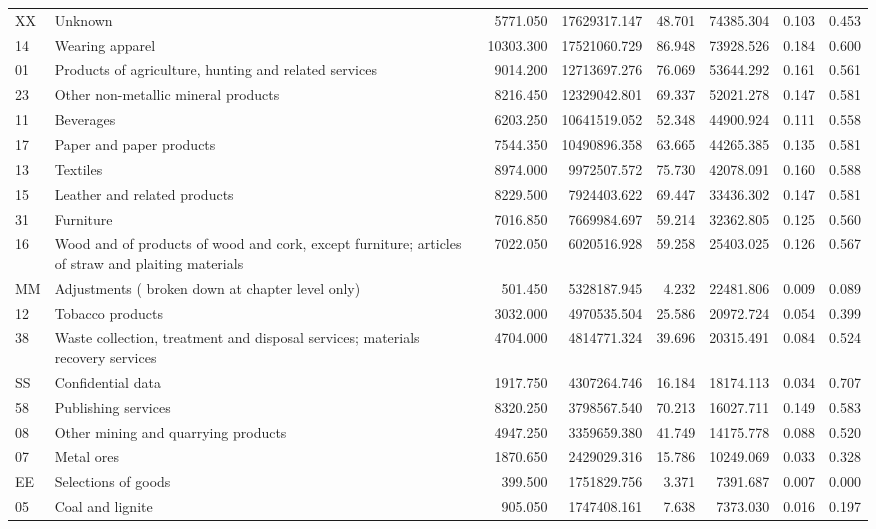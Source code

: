 \begin{tabular}{llrrrrrr}
 XX & Unknown & 5771.050 & 17629317.147 & 48.701 & 74385.304 & 0.103 & 0.453 \\
 14 & Wearing apparel & 10303.300 & 17521060.729 & 86.948 & 73928.526 & 0.184 & 0.600 \\
 01 & Products of agriculture, hunting and related services & 9014.200 & 12713697.276 & 76.069 & 53644.292 & 0.161 & 0.561 \\
 23 & Other non-metallic mineral products & 8216.450 & 12329042.801 & 69.337 & 52021.278 & 0.147 & 0.581 \\
 11 & Beverages & 6203.250 & 10641519.052 & 52.348 & 44900.924 & 0.111 & 0.558 \\
 17 & Paper and paper products & 7544.350 & 10490896.358 & 63.665 & 44265.385 & 0.135 & 0.581 \\
 13 & Textiles & 8974.000 & 9972507.572 & 75.730 & 42078.091 & 0.160 & 0.588 \\
 15 & Leather and related products & 8229.500 & 7924403.622 & 69.447 & 33436.302 & 0.147 & 0.581 \\
 31 & Furniture & 7016.850 & 7669984.697 & 59.214 & 32362.805 & 0.125 & 0.560 \\
 16 & Wood and of products of wood and cork, except furniture; articles of straw and plaiting materials & 7022.050 & 6020516.928 & 59.258 & 25403.025 & 0.126 & 0.567 \\
 MM & Adjustments ( broken down at chapter level only) & 501.450 & 5328187.945 & 4.232 & 22481.806 & 0.009 & 0.089 \\
 12 & Tobacco products & 3032.000 & 4970535.504 & 25.586 & 20972.724 & 0.054 & 0.399 \\
 38 & Waste collection, treatment and disposal services; materials recovery services & 4704.000 & 4814771.324 & 39.696 & 20315.491 & 0.084 & 0.524 \\
 SS & Confidential data & 1917.750 & 4307264.746 & 16.184 & 18174.113 & 0.034 & 0.707 \\
 58 & Publishing services & 8320.250 & 3798567.540 & 70.213 & 16027.711 & 0.149 & 0.583 \\
 08 & Other mining and quarrying products & 4947.250 & 3359659.380 & 41.749 & 14175.778 & 0.088 & 0.520 \\
 07 & Metal ores & 1870.650 & 2429029.316 & 15.786 & 10249.069 & 0.033 & 0.328 \\
 EE & Selections of goods & 399.500 & 1751829.756 & 3.371 & 7391.687 & 0.007 & 0.000 \\
 05 & Coal and lignite & 905.050 & 1747408.161 & 7.638 & 7373.030 & 0.016 & 0.197 \\

\end{tabular}
